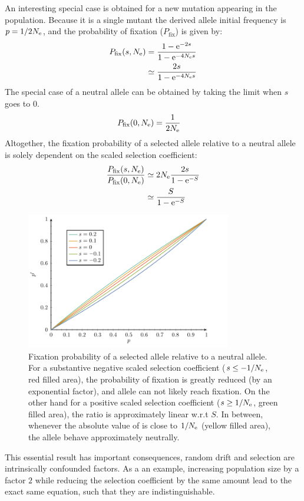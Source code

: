 An interesting special case is obtained for a new mutation appearing in the population.
Because it is a single mutant the derived \gls{allele} initial frequency is $p = 1 / 2 N_{\textrm{e}}$, and the probability of fixation ($P_{\mathrm{fix}}$) is given by:
\begin{align}
    P_{\mathrm{fix}}(s, N_{\textrm{e}}) & = \dfrac{1 - \mathrm{e}^{-2 s}}{1 - \mathrm{e}^{-4 N_{\textrm{e}} s}} \\
    & \simeq  \dfrac{2 s }{1 - \mathrm{e}^{-4 N_{\textrm{e}} s}}
\end{align}
The special case of a \gls{neutral} \gls{allele} can be obtained by taking the limit when $s$ goes to $0$.
\begin{align}
    P_{\mathrm{fix}}(0, N_{\textrm{e}}) & = \dfrac{1}{2 N_{\textrm{e}}}
\end{align}
Altogether, the fixation probability of a selected \gls{allele} relative to a \gls{neutral} \gls{allele} is solely dependent on the scaled selection coefficient:
\begin{align}
    \dfrac{P_{\mathrm{fix}}(s, N_{\textrm{e}})}{P_{\mathrm{fix}}(0, N_{\textrm{e}})} & \simeq 2 N_{\textrm{e}} \dfrac{2s}{1 - \mathrm{e}^{-S}} \\
    & \simeq  \dfrac{S}{1 - \mathrm{e}^{-S}} \label{eq:p-fix}
\end{align}
\begin{figure}[H]
    \centering
    \includegraphics[width=0.8\textwidth, page=2] {figures.pdf}
    \caption[Relative fixation probability]{Fixation probability of a selected {allele} relative to a {neutral} {allele}.
    For a substantive negative scaled selection coefficient ($s \leq -1/N_{\textrm{e}}$, red filled area), the probability of fixation is greatly reduced (by an exponential factor), and \gls{allele} can not likely reach fixation. On the other hand for a positive scaled selection coefficient ($s \geq 1 / N_{\textrm{e}}$, green filled area), the ratio is approximately linear w.r.t $S$. In between, whenever the absolute value of is close to $1 / N_{\textrm{e}}$ (yellow filled area), the \gls{allele} behave approximately neutrally.}
\end{figure}
This essential result has important consequences, random \gls{drift} and selection are intrinsically confounded factors.
As a an example, increasing population size by a factor $2$ while reducing the selection coefficient by the same amount lead to the exact same equation, such that they are indistinguishable.

